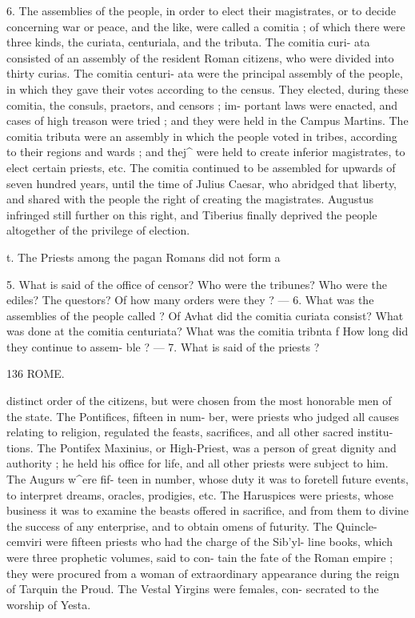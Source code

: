 \documentclass[openany,a4paper]{memoir}
\begin{document}
6. The assemblies of the people, in order to elect their 
magistrates, or to decide concerning war or peace, and the 
like, were called a comitia ; of which there were three kinds, 
the curiata, centuriala, and the tributa. The comitia curi- 
ata consisted of an assembly of the resident Roman citizens, 
who were divided into thirty curias. The comitia centuri- 
ata were the principal assembly of the people, in which they 
gave their votes according to the census. They elected, 
during these comitia, the consuls, praetors, and censors ; im- 
portant laws were enacted, and cases of high treason were 
tried ; and they were held in the Campus Martins. The 
comitia tributa were an assembly in which the people voted 
in tribes, according to their regions and wards ; and thej^ 
were held to create inferior magistrates, to elect certain 
priests, etc. The comitia continued to be assembled for 
upwards of seven hundred years, until the time of Julius 
Caesar, who abridged that liberty, and shared with the people 
the right of creating the magistrates. Augustus infringed 
still further on this right, and Tiberius finally deprived the 
people altogether of the privilege of election. 

t. The Priests among the pagan Romans did not form a 

5. What is said of the office of censor? Who were the tribunes? 
Who were the ediles? The questors? Of how many orders were 
they ? — 6. What was the assemblies of the people called ? Of Avhat did 
the comitia curiata consist? What was done at the comitia centuriata? 
What was the comitia tribnta f How long did they continue to assem- 
ble ? — 7. What is said of the priests ? 



136 ROME. 

distinct order of the citizens, but were chosen from the most 
honorable men of the state. The Pontifices, fifteen in num- 
ber, were priests who judged all causes relating to religion, 
regulated the feasts, sacrifices, and all other sacred institu- 
tions. The Pontifex Maxinius, or High-Priest, was a person 
of great dignity and authority ; he held his office for life, and 
all other priests were subject to him. The Augurs w^ere fif- 
teen in number, whose duty it was to foretell future events, 
to interpret dreams, oracles, prodigies, etc. The Haruspices 
were priests, whose business it was to examine the beasts 
offered in sacrifice, and from them to divine the success of 
any enterprise, and to obtain omens of futurity. The Quincle- 
cemviri were fifteen priests who had the charge of the Sib'yl- 
line books, which were three prophetic volumes, said to con- 
tain the fate of the Roman empire ; they were procured from 
a woman of extraordinary appearance during the reign of 
Tarquin the Proud. The Vestal Yirgins were females, con- 
secrated to the worship of Yesta. 
\end{document}
